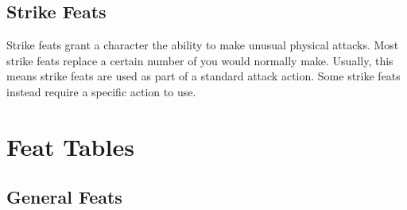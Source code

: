     \subsection{Strike Feats}\label{Strike Feats}
        Strike feats grant a character the ability to make unusual physical attacks.
        Most strike feats replace a certain number of  you would normally make.
        Usually, this means strike feats are used as part of a standard attack action.
        Some strike feats instead require a specific action to use.

\section{Feat Tables}
    \onecolumn

    \subsection{General Feats}
